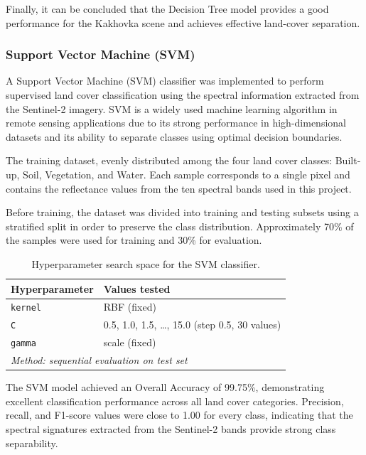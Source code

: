 \documentclass{article}
\begin{document}
Finally, it can be concluded that the Decision Tree model provides a good performance for the Kakhovka scene and achieves effective land-cover separation.

\subsubsection{Support Vector Machine (SVM)}

A Support Vector Machine (SVM) classifier was implemented to perform supervised land cover classification using the spectral information extracted from
the Sentinel-2 imagery. SVM is a widely used machine learning algorithm in remote sensing applications due to its strong performance in high-dimensional
datasets and its ability to separate classes using optimal decision boundaries.

The training dataset, evenly distributed among the four land cover classes: Built-up, Soil, Vegetation, and Water. Each
sample corresponds to a single pixel and contains the reflectance values from the ten spectral bands used in this project.

Before training, the dataset was divided into training and testing subsets using a stratified split in order to preserve the class distribution.
Approximately 70\% of the samples were used for training and 30\% for evaluation.

\begin{table}[H]
    \centering
    \caption{Hyperparameter search space for the SVM classifier.}
    \label{tab:svm_hpo}
    \begin{tabular}{ll}
        \hline
        \textbf{Hyperparameter} & \textbf{Values tested} \\
        \hline
        \texttt{kernel}  & RBF (fixed) \\
        \texttt{C}       & 0.5, 1.0, 1.5, \ldots, 15.0 (step 0.5, 30 values) \\
        \texttt{gamma}   & scale (fixed) \\
        \hline
        \multicolumn{2}{l}{\textit{Method: sequential evaluation on test set}} \\
        \hline
    \end{tabular}
\end{table}

The SVM model achieved an Overall Accuracy of 99.75\%, demonstrating excellent classification performance across all land cover categories. Precision,
recall, and F1-score values were close to 1.00 for every class, indicating that the spectral signatures extracted from the Sentinel-2 bands provide strong
class separability.
\end{document}
